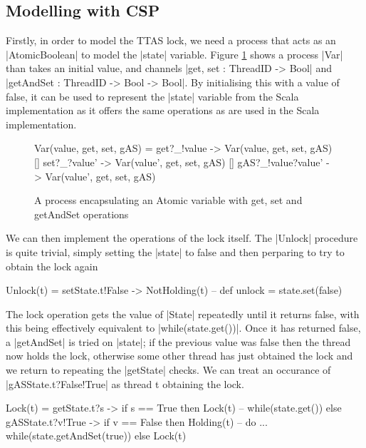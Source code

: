 \subsection{Modelling with CSP}

Firstly, in order to model the TTAS lock, we need a process that acts as an |AtomicBoolean| to model the |state| variable. Figure \ref{csp:Variable} shows a process |Var| than takes an initial value, and channels |get, set : ThreadID -> Bool| and |getAndSet : ThreadID -> Bool -> Bool|. By initialising this with a value of false, it can be used to represent the |state| variable from the Scala implementation as it offers the same operations as are used in the Scala implementation.

\begin{figure}
  \begin{cspm}
  Var(value, get, set, gAS) = 
    get?_!value -> Var(value, get, set, gAS)
    [] set?_?value' -> Var(value', get, set, gAS)
    [] gAS?_!value?value' -> Var(value', get, set, gAS)
  \end{cspm}
  \caption{A process encapsulating an Atomic variable with get, set and getAndSet operations}
  \label{csp:Variable}
\end{figure}

We can then implement the operations of the lock itself. The |Unlock| procedure is quite trivial, simply setting the |state| to false and then perparing to try to obtain the lock again
\begin{cspm}
  Unlock(t) = setState.t!False -> NotHolding(t) -- def unlock = state.set(false)
\end{cspm}

The lock operation gets the value of |State| repeatedly until it returns false, with this being effectively equivalent to |while(state.get()){}|. Once it has returned false, a |getAndSet| is tried on |state|; if the previous value was false then the thread now holds the lock, otherwise some other thread has just obtained the lock and we return to repeating the |getState| checks. We can treat an occurance of |gASState.t?False!True| as thread t obtaining the lock.

\begin{cspm}
  Lock(t) =  getState.t?s -> if s == True then Lock(t) -- while(state.get()){ }
           else gASState.t?v!True -> if v == False then Holding(t) 
                -- do ... while(state.getAndSet(true))
           else Lock(t)
\end{cspm}

